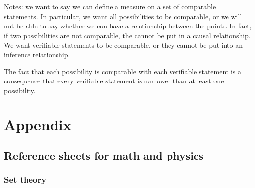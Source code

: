 \documentclass[11pt,letterpaper,fleqn]{memoir} %
\begin{document}
Notes: we want to say we can define a measure on a set of comparable statements. In particular, we want all possibilities to be comparable, or we will not be able to say whether we can have a relationship between the points. In fact, if two possibilities are not comparable, the cannot be put in a causal relationship. We want verifiable statements to be comparable, or they cannot be put into an inference relationship.

The fact that each possibility is comparable with each verifiable statement is a consequence that every verifiable statement is narrower than at least one possibility.


\fi

\appendix

\part{Appendix}

\chapter{Reference sheets for math and physics}

\section{Set theory}
\end{document}

